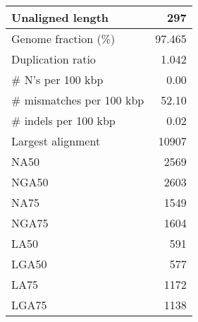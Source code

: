 \documentclass[12pt,a4paper]{article}
\begin{document}
\begin{table}[ht]
\begin{center}
\begin{tabular}{|l*{1}{|r}|}
Unaligned length & 297 \\ \hline
Genome fraction (\%) & 97.465 \\ \hline
Duplication ratio & 1.042 \\ \hline
\# N's per 100 kbp & 0.00 \\ \hline
\# mismatches per 100 kbp & 52.10 \\ \hline
\# indels per 100 kbp & 0.02 \\ \hline
Largest alignment & 10907 \\ \hline
NA50 & 2569 \\ \hline
NGA50 & 2603 \\ \hline
NA75 & 1549 \\ \hline
NGA75 & 1604 \\ \hline
LA50 & 591 \\ \hline
LGA50 & 577 \\ \hline
LA75 & 1172 \\ \hline
LGA75 & 1138 \\ \hline
\end{tabular}
\end{center}
\end{table}
\end{document}
